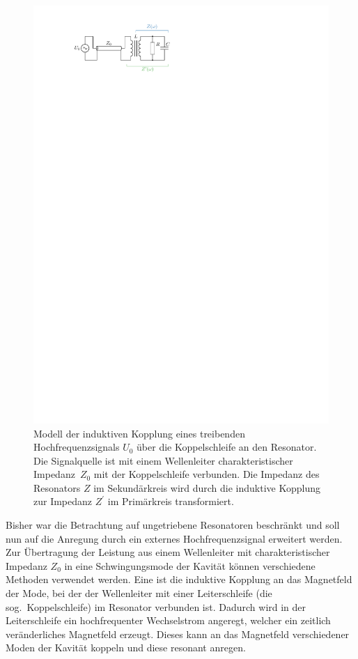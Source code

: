 \begin{figure}[h]
  \centering
  \includegraphics[scale=1.4]{./figs/RLC_coupling.pdf}
  \caption{Modell der induktiven Kopplung eines treibenden Hochfrequenzsignals $U_0$ über die Koppelschleife an den Resonator. Die Signalquelle ist mit einem Wellenleiter charakteristischer Impedanz~$Z_0$ mit der Koppelschleife verbunden. Die Impedanz des Resonators $Z$ im Sekundärkreis wird durch die induktive Kopplung zur Impedanz $Z^\prime$ im Primärkreis transformiert.}
  \label{fig:rlc_coupling}
\end{figure}
Bisher war die Betrachtung auf ungetriebene Resonatoren beschränkt und soll nun auf die Anregung durch ein externes Hochfrequenzsignal erweitert werden.
Zur Übertragung der Leistung aus einem Wellenleiter mit charakteristischer Impedanz $Z_0$ in eine Schwingungsmode der Kavität können verschiedene Methoden verwendet werden.
Eine ist die induktive Kopplung an das Magnetfeld der Mode, bei der der Wellenleiter mit einer Leiterschleife (die sog.\ Koppelschleife) im Resonator verbunden ist.
Dadurch wird in der Leiterschleife ein hochfrequenter Wechselstrom angeregt, welcher ein zeitlich veränderliches Magnetfeld erzeugt. Dieses kann an das Magnetfeld verschiedener Moden der Kavität koppeln und diese resonant anregen.

